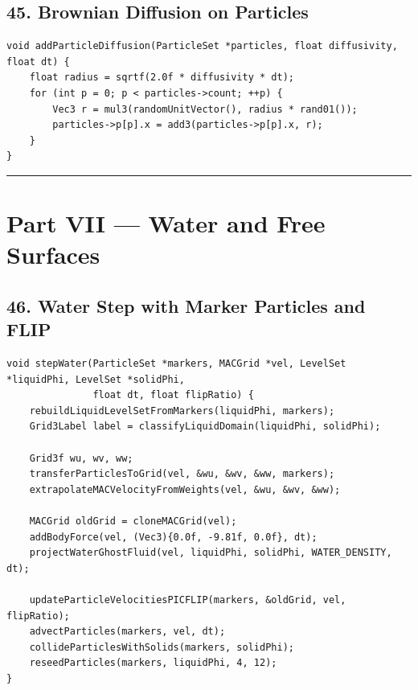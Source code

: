 \documentclass[10pt,letterpaper]{article}
\begin{document}
\subsection*{45. Brownian Diffusion on Particles}

\begin{verbatim}
void addParticleDiffusion(ParticleSet *particles, float diffusivity, float dt) {
    float radius = sqrtf(2.0f * diffusivity * dt);
    for (int p = 0; p < particles->count; ++p) {
        Vec3 r = mul3(randomUnitVector(), radius * rand01());
        particles->p[p].x = add3(particles->p[p].x, r);
    }
}
\end{verbatim}

\medskip\hrule\medskip

\clearpage
{}
\section*{Part VII --- Water and Free Surfaces}

\subsection*{46. Water Step with Marker Particles and FLIP}

\begin{verbatim}
void stepWater(ParticleSet *markers, MACGrid *vel, LevelSet *liquidPhi, LevelSet *solidPhi,
               float dt, float flipRatio) {
    rebuildLiquidLevelSetFromMarkers(liquidPhi, markers);
    Grid3Label label = classifyLiquidDomain(liquidPhi, solidPhi);

    Grid3f wu, wv, ww;
    transferParticlesToGrid(vel, &wu, &wv, &ww, markers);
    extrapolateMACVelocityFromWeights(vel, &wu, &wv, &ww);

    MACGrid oldGrid = cloneMACGrid(vel);
    addBodyForce(vel, (Vec3){0.0f, -9.81f, 0.0f}, dt);
    projectWaterGhostFluid(vel, liquidPhi, solidPhi, WATER_DENSITY, dt);

    updateParticleVelocitiesPICFLIP(markers, &oldGrid, vel, flipRatio);
    advectParticles(markers, vel, dt);
    collideParticlesWithSolids(markers, solidPhi);
    reseedParticles(markers, liquidPhi, 4, 12);
}
\end{verbatim}
\end{document}
